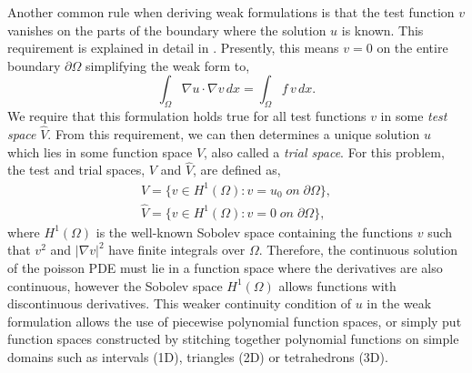 Another common rule when deriving weak formulations is that the test function $v$ vanishes on the parts of the boundary where the solution $u$ is known.  This requirement is explained in detail in \cite{Langtangen2019}.  Presently, this means $v=0$ on the entire boundary $\partial \Omega$ simplifying the weak form to,
\begin{equation}
\int_{\Omega} \nabla u \cdot \nabla v \, dx = \int_{\Omega} f \, v \, dx.
\end{equation}
We require that this formulation holds true for all test functions $v$ in some \textit{test space} $\hat{V}$.  From this requirement, we can then determines a unique solution $u$ which lies in some function space $V$, also called a \textit{trial space}.  For this problem, the test and trial spaces, $V$ and $\hat{V}$, are defined as,
\begin{align}
V = \lbrace v \in H^1 (\Omega) : v=u_0 \; on \; \partial \Omega \rbrace, \label{TrialSpace} \\
\hat{V} = \lbrace v \in H^1 (\Omega) : v=0 \; on \; \partial \Omega \rbrace, \label{TestSpace}
\end{align}
where $H^1 (\Omega)$ is the well-known Sobolev space containing the functions $v$ such that $v^2$ and $|\nabla v|^2$ have finite integrals over $\Omega$.  Therefore, the continuous solution of the poisson PDE must lie in a function space where the derivatives are also continuous, however the Sobolev space $H^1 (\Omega)$ allows functions with discontinuous derivatives.  This weaker continuity condition of $u$ in the weak formulation allows the use of piecewise polynomial function spaces, or simply put function spaces constructed by stitching together polynomial functions on simple domains such as intervals (1D), triangles (2D) or tetrahedrons (3D).

